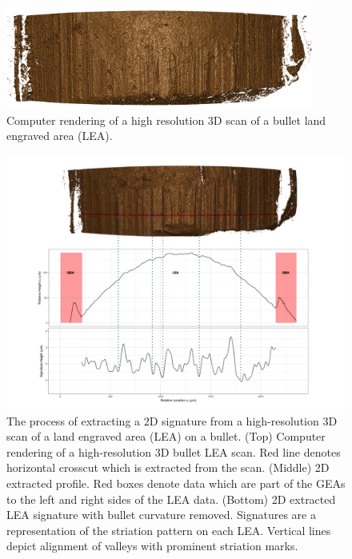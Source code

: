 \documentclass[12pt]{article}
\begin{document}
\begin{figure}
\centering
\includegraphics[width=0.9\textwidth]{../images/scan_example}
\caption{Computer rendering of a high resolution 3D scan of a bullet land engraved area (LEA).}
\label{scan-example}
\end{figure}

\begin{figure}
\centering
\includegraphics[width=\textwidth]{../images/process_vertical_png}
\caption{The process of extracting a 2D signature from a high-resolution 3D scan of a land engraved area (LEA) on a bullet. (Top) Computer rendering of a high-resolution 3D bullet LEA scan. Red line denotes horizontal crosscut which is extracted from the scan. (Middle) 2D extracted profile. Red boxes denote data which are part of the GEAs to the left and right sides of the LEA data. (Bottom) 2D extracted LEA signature with bullet curvature removed. Signatures are a representation of the striation pattern on each LEA. Vertical lines depict alignment of valleys with prominent striation marks.}  
\label{processing-process}
\end{figure}
\end{document}
